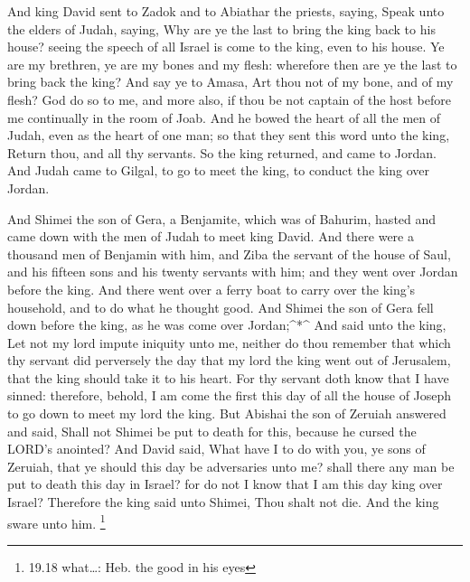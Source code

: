  And king David sent to Zadok and to Abiathar the priests,
saying, Speak unto the elders of Judah, saying, Why are ye the last to
bring the king back to his house? seeing the speech of all Israel is
come to the king, even to his house.  Ye are my brethren,
ye are my bones and my flesh: wherefore then are ye the last to bring
back the king?  And say ye to Amasa, Art thou not of my
bone, and of my flesh? God do so to me, and more also, if thou be not
captain of the host before me continually in the room of Joab.
 And he bowed the heart of all the men of Judah, even as
the heart of one man; so that they sent this word unto the king, Return
thou, and all thy servants.  So the king returned, and came
to Jordan. And Judah came to Gilgal, to go to meet the king, to conduct
the king over Jordan.

 And Shimei the son of Gera, a Benjamite, which was of
Bahurim, hasted and came down with the men of Judah to meet king David.
 And there were a thousand men of Benjamin with him, and
Ziba the servant of the house of Saul, and his fifteen sons and his
twenty servants with him; and they went over Jordan before the king.
 And there went over a ferry boat to carry over the king's
household, and to do what he thought good. And Shimei the son of Gera
fell down before the king, as he was come over Jordan;\^{}*\^{}
 And said unto the king, Let not my lord impute iniquity
unto me, neither do thou remember that which thy servant did perversely
the day that my lord the king went out of Jerusalem, that the king
should take it to his heart.  For thy servant doth know
that I have sinned: therefore, behold, I am come the first this day of
all the house of Joseph to go down to meet my lord the king.
 But Abishai the son of Zeruiah answered and said, Shall
not Shimei be put to death for this, because he cursed the LORD's
anointed?  And David said, What have I to do with you, ye
sons of Zeruiah, that ye should this day be adversaries unto me? shall
there any man be put to death this day in Israel? for do not I know that
I am this day king over Israel?  Therefore the king said
unto Shimei, Thou shalt not die. And the king sware unto him.
\footnote{19.18 what\ldots: Heb. the good in his eyes}

